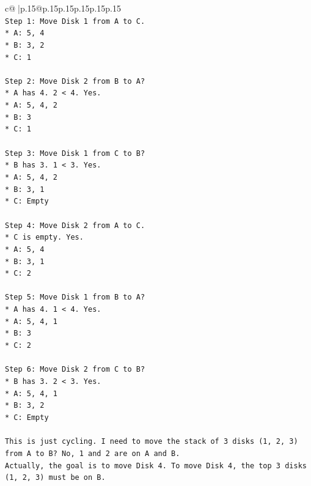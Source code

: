\documentclass{article}
\begin{document}
{\begin{supertabular}{c@{$\;$}|p{.15\linewidth}@{}p{.15\linewidth}p{.15\linewidth}p{.15\linewidth}p{.15\linewidth}p{.15\linewidth}}
{{{\\ 
\texttt{Step 1: Move Disk 1 from A to C.} \\
\texttt{*   A: 5, 4} \\
\texttt{*   B: 3, 2} \\
\texttt{*   C: 1} \\
\\ 
\texttt{Step 2: Move Disk 2 from B to A?} \\
\texttt{*   A has 4. 2 < 4. Yes.} \\
\texttt{*   A: 5, 4, 2} \\
\texttt{*   B: 3} \\
\texttt{*   C: 1} \\
\\ 
\texttt{Step 3: Move Disk 1 from C to B?} \\
\texttt{*   B has 3. 1 < 3. Yes.} \\
\texttt{*   A: 5, 4, 2} \\
\texttt{*   B: 3, 1} \\
\texttt{*   C: Empty} \\
\\ 
\texttt{Step 4: Move Disk 2 from A to C.} \\
\texttt{*   C is empty. Yes.} \\
\texttt{*   A: 5, 4} \\
\texttt{*   B: 3, 1} \\
\texttt{*   C: 2} \\
\\ 
\texttt{Step 5: Move Disk 1 from B to A?} \\
\texttt{*   A has 4. 1 < 4. Yes.} \\
\texttt{*   A: 5, 4, 1} \\
\texttt{*   B: 3} \\
\texttt{*   C: 2} \\
\\ 
\texttt{Step 6: Move Disk 2 from C to B?} \\
\texttt{*   B has 3. 2 < 3. Yes.} \\
\texttt{*   A: 5, 4, 1} \\
\texttt{*   B: 3, 2} \\
\texttt{*   C: Empty} \\
\\ 
\texttt{This is just cycling. I need to move the stack of 3 disks (1, 2, 3) from A to B? No, 1 and 2 are on A and B.} \\
\texttt{Actually, the goal is to move Disk 4. To move Disk 4, the top 3 disks (1, 2, 3) must be on B.} \\
}}}
\end{supertabular}}
\end{document}
